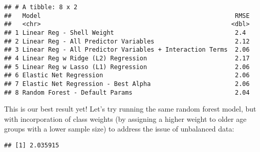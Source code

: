 \documentclass[
]{article}
\newenvironment{Shaded}{\begin{snugshade}}{\end{snugshade}}
\newcommand{\AttributeTok}[1]{\textcolor[rgb]{0.13,0.29,0.53}{#1}}
\newcommand{\CommentTok}[1]{\textcolor[rgb]{0.56,0.35,0.01}{\textit{#1}}}
\newcommand{\DecValTok}[1]{\textcolor[rgb]{0.00,0.00,0.81}{#1}}
\newcommand{\FunctionTok}[1]{\textcolor[rgb]{0.13,0.29,0.53}{\textbf{#1}}}
\newcommand{\NormalTok}[1]{#1}
\newcommand{\OtherTok}[1]{\textcolor[rgb]{0.56,0.35,0.01}{#1}}
\newcommand{\SpecialCharTok}[1]{\textcolor[rgb]{0.81,0.36,0.00}{\textbf{#1}}}
\begin{document}
\begin{verbatim}
## # A tibble: 8 x 2
##   Model                                                     RMSE
##   <chr>                                                    <dbl>
## 1 Linear Reg - Shell Weight                                 2.4 
## 2 Linear Reg - All Predictor Variables                      2.12
## 3 Linear Reg - All Predictor Variables + Interaction Terms  2.06
## 4 Linear Reg w Ridge (L2) Regression                        2.17
## 5 Linear Reg w Lasso (L1) Regression                        2.06
## 6 Elastic Net Regression                                    2.06
## 7 Elastic Net Regression - Best Alpha                       2.06
## 8 Random Forest - Default Params                            2.04
\end{verbatim}

This is our best result yet! Let's try running the same random forest
model, but with incorporation of class weights (by assigning a higher
weight to older age groups with a lower sample size) to address the
issue of unbalanced data:

\begin{Shaded}
\end{Shaded}

\begin{verbatim}
## [1] 2.035915
\end{verbatim}
\end{document}
